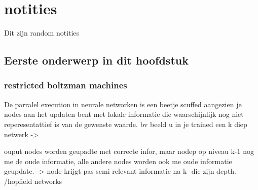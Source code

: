 \chapter{notities}
\label{hoofdstuk:1}
Dit zijn random notities
\section{Eerste onderwerp in dit hoofdstuk}

\subsection{restricted boltzman machines}
De parralel execution in neurale networken is een beetje scuffed aangezien je nodes aan het updaten bent met lokale informatie die waarschijnlijk nog niet reperesentattief is van de gewenste waarde. bv beeld u in je trained een k diep netwerk ->

ouput nodes worden  geupadte met correcte infor, maar nodep op niveau k-1 nog me de oude informatie, alle andere nodes worden ook me oude informatie geupdate. 
-> node krijgt pas semi relevant informatie na k- die zijn depth. 
/hopfield networks


